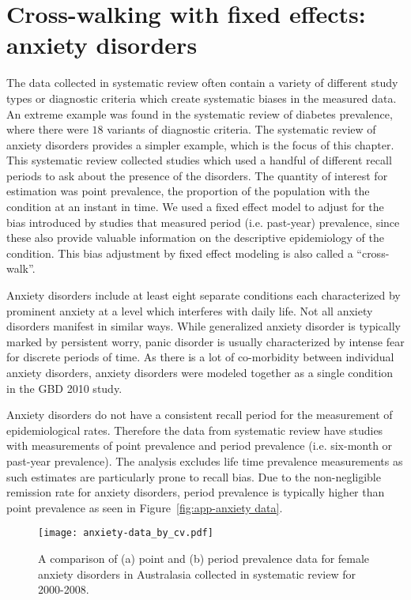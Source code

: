 \chapter{Cross-walking with fixed effects: anxiety disorders}
\label{applications-efx_study_level}

The data collected in systematic review often contain a variety of
different study types or diagnostic criteria which create systematic
biases in the measured data.  An extreme example was found in the
systematic review of diabetes prevalence, where there were $18$ variants
of diagnostic criteria.  The systematic review of anxiety disorders
provides a simpler example, which is the focus of this chapter. This
systematic review collected studies which used a handful of different
recall periods to ask about the presence of the disorders. The quantity
of interest for estimation was point prevalence, the
proportion of the population with the condition at an instant in time.
We used a fixed effect model to adjust for the bias introduced by
studies that measured period (i.e. past-year) prevalence, since these also provide
valuable information on the descriptive epidemiology of the condition.
This bias adjustment by fixed effect modeling is also called a
``cross-walk''.

Anxiety disorders include at least eight separate conditions each
characterized by prominent anxiety at a level which interferes with
daily life.  Not all anxiety disorders manifest in similar ways.
While generalized anxiety disorder is typically marked by persistent
worry, panic disorder is usually characterized by intense fear for
discrete periods of time. \cite{american_psychiatric_association_diagnostic_2000} As there is
a lot of co-morbidity between individual anxiety disorders, anxiety
disorders were modeled together as a single condition in the GBD 2010
study.

Anxiety disorders do not have a consistent recall period for the
measurement of epidemiological rates.  Therefore the data from
systematic review have studies with measurements of point prevalence
and period prevalence (i.e. six-month or past-year prevalence).  The
analysis excludes life time prevalence measurements as such estimates
are particularly prone to recall bias.  Due to the non-negligible
remission rate for anxiety disorders, period prevalence is typically
higher than point prevalence as seen in Figure~\ref{fig:app-anxiety
  data}.

    \begin{figure}[h]
        \begin{center}
            \texttt{[image: anxiety-data\_by\_cv.pdf]}
            \caption{A comparison of (a) point and (b) period prevalence data
              for female anxiety disorders in Australasia collected in systematic review for
              2000-2008.}
            \label{fig:app-anxiety data}
        \end{center}
    \end{figure}

